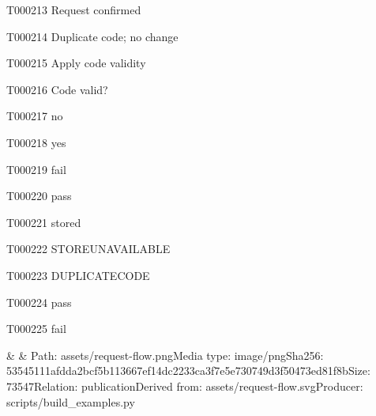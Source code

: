 \documentclass[11pt,a4paper]{article}
\begin{document}
\begin{atlasitem}{T000213}
Request confirmed
\end{atlasitem}
\begin{atlasitem}{T000214}
Duplicate code; no change
\end{atlasitem}
\begin{atlasitem}{T000215}
Apply code validity
\end{atlasitem}
\begin{atlasitem}{T000216}
Code valid?
\end{atlasitem}
\begin{atlasitem}{T000217}
no
\end{atlasitem}
\begin{atlasitem}{T000218}
yes
\end{atlasitem}
\begin{atlasitem}{T000219}
fail
\end{atlasitem}
\begin{atlasitem}{T000220}
pass
\end{atlasitem}
\begin{atlasitem}{T000221}
stored
\end{atlasitem}
\begin{atlasitem}{T000222}
STORE\AtlasCharUnderscore{}UNAVAILABLE
\end{atlasitem}
\begin{atlasitem}{T000223}
DUPLICATE\AtlasCharUnderscore{}CODE
\end{atlasitem}
\begin{atlasitem}{T000224}
pass
\end{atlasitem}
\begin{atlasitem}{T000225}
fail
\end{atlasitem}
\par{}
\begin{AtlasCatalog}
 &  & Path: assets/\allowbreak{}request-\allowbreak{}flow.\allowbreak{}png\newline{}Media type: image/\allowbreak{}png\newline{}Sha256: 53545111afdda2bc\allowbreak{}f5b113667ef14dc2\allowbreak{}233ca3f7e5e73074\allowbreak{}9d3f50473ed81f8b\allowbreak{}\newline{}Size: 73547\newline{}Relation: publication\newline{}Derived from: assets/\allowbreak{}request-\allowbreak{}flow.\allowbreak{}svg\newline{}Producer: scripts/\allowbreak{}build\_\allowbreak{}examples.\allowbreak{}py\\\addlinespace[.35em]
\end{AtlasCatalog}
\end{document}
